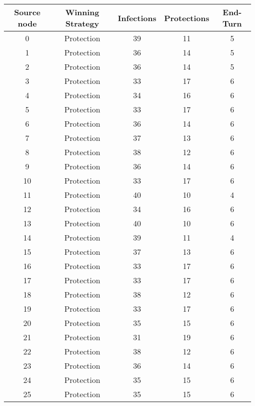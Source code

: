 \documentclass[results.tex]{subfiles}
\begin{document}
\begin{center}
  \begin{tabular}{| c || c | c | c | c |}
    \hline
    {\bfseries Source node} & {\bfseries Winning Strategy} & {\bfseries Infections} & {\bfseries Protections} & {\bfseries End-Turn} \\  %
    \hline\hline
    0 & Protection & 39 & 11 & 5 \\ 
    \hline
    1 & Protection & 36 & 14 & 5 \\ 
    \hline
    2 & Protection & 36 & 14 & 5 \\ 
    \hline
    3 & Protection & 33 & 17 & 6 \\ 
    \hline
    4 & Protection & 34 & 16 & 6 \\ 
    \hline
    5 & Protection & 33 & 17 & 6 \\ 
    \hline
    6 & Protection & 36 & 14 & 6 \\ 
    \hline
    7 & Protection & 37 & 13 & 6 \\ 
    \hline
    8 & Protection & 38 & 12 & 6 \\ 
    \hline
    9 & Protection & 36 & 14 & 6 \\ 
    \hline
    10 & Protection & 33 & 17 & 6 \\ 
    \hline
    11 & Protection & 40 & 10 & 4 \\ 
    \hline
    12 & Protection & 34 & 16 & 6 \\ 
    \hline
    13 & Protection & 40 & 10 & 6 \\ 
    \hline
    14 & Protection & 39 & 11 & 4 \\ 
    \hline
    15 & Protection & 37 & 13 & 6 \\ 
    \hline
    16 & Protection & 33 & 17 & 6 \\ 
    \hline
    17 & Protection & 33 & 17 & 6 \\ 
    \hline
    18 & Protection & 38 & 12 & 6 \\ 
    \hline
    19 & Protection & 33 & 17 & 6 \\ 
    \hline
    20 & Protection & 35 & 15 & 6 \\ 
    \hline
    21 & Protection & 31 & 19 & 6 \\ 
    \hline
    22 & Protection & 38 & 12 & 6 \\ 
    \hline
    23 & Protection & 36 & 14 & 6 \\ 
    \hline
    24 & Protection & 35 & 15 & 6 \\ 
    \hline
    25 & Protection & 35 & 15 & 6 \\ 

\end{tabular}
\end{center}
\end{document}
